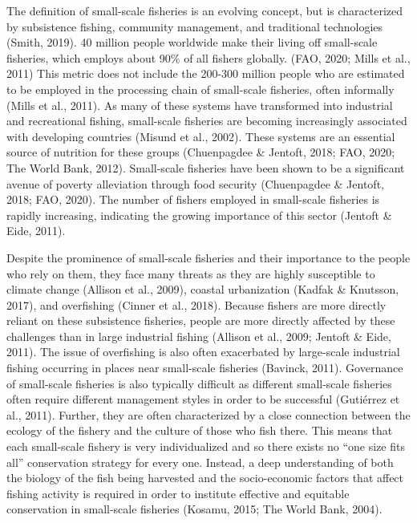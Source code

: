 \documentclass[
]{article}
\begin{document}
The definition of small-scale fisheries is an evolving concept, but is characterized by subsistence fishing, community management, and traditional technologies (Smith, 2019). 40 million people worldwide make their living off small-scale fisheries, which employs about 90\% of all fishers globally. (FAO, 2020; Mills et al., 2011) This metric does not include the 200-300 million people who are estimated to be employed in the processing chain of small-scale fisheries, often informally (Mills et al., 2011). As many of these systems have transformed into industrial and recreational fishing, small-scale fisheries are becoming increasingly associated with developing countries (Misund et al., 2002). These systems are an essential source of nutrition for these groups (Chuenpagdee \& Jentoft, 2018; FAO, 2020; The World Bank, 2012). Small-scale fisheries have been shown to be a significant avenue of poverty alleviation through food security (Chuenpagdee \& Jentoft, 2018; FAO, 2020). The number of fishers employed in small-scale fisheries is rapidly increasing, indicating the growing importance of this sector (Jentoft \& Eide, 2011).

Despite the prominence of small-scale fisheries and their importance to the people who rely on them, they face many threats as they are highly susceptible to climate change (Allison et al., 2009), coastal urbanization (Kadfak \& Knutsson, 2017), and overfishing (Cinner et al., 2018). Because fishers are more directly reliant on these subsistence fisheries, people are more directly affected by these challenges than in large industrial fishing (Allison et al., 2009; Jentoft \& Eide, 2011). The issue of overfishing is also often exacerbated by large-scale industrial fishing occurring in places near small-scale fisheries (Bavinck, 2011). Governance of small-scale fisheries is also typically difficult as different small-scale fisheries often require different management styles in order to be successful (Gutiérrez et al., 2011). Further, they are often characterized by a close connection between the ecology of the fishery and the culture of those who fish there. This means that each small-scale fishery is very individualized and so there exists no ``one size fits all'' conservation strategy for every one. Instead, a deep understanding of both the biology of the fish being harvested and the socio-economic factors that affect fishing activity is required in order to institute effective and equitable conservation in small-scale fisheries (Kosamu, 2015; The World Bank, 2004).
\end{document}

